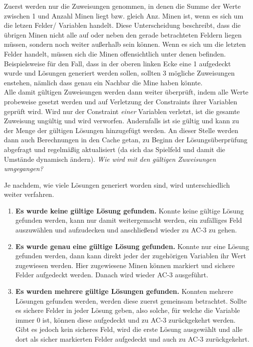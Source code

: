 Zuerst werden nur die Zuweisungen genommen, in denen die Summe der Werte zwischen 1 und Anzahl Minen liegt bzw. gleich Anz. Minen ist, wenn es
sich um die letzen Felder/ Variablen handelt. Diese Unterscheidung beschreibt, dass die übrigen Minen nicht alle auf oder neben den gerade
betrachteten Feldern liegen müssen, sondern noch weiter außerhalb sein können. Wenn es sich um die letzten Felder handelt, müssen sich die
Minen offensichtlich unter denen befinden. Beispielsweise für den Fall, dass in der oberen linken Ecke eine 1 aufgedeckt wurde und Lösungen
generiert werden sollen, sollten 3 mögliche Zuweisungen enstehen, nämlich dass genau ein Nachbar die Mine haben könnte.\\
Alle damit gültigen Zuweisungen werden dann weiter überprüft, indem alle Werte probeweise gesetzt werden und auf Verletzung der Constraints
ihrer Variablen geprüft wird. Wird nur der Constraint \textit{einer} Variablen verletzt, ist die gesamte Zuweisung ungültig und wird verworfen.
Andernfalls ist sie gültig und kann zu der Menge der gültigen Lösungen hinzugefügt werden. An dieser Stelle werden dann auch Berechnungen
in den Cache getan, zu Beginn der Lösungsüberprüfung abgefragt und regelmäßig aktualisiert (da sich das Spielfeld und damit die Umstände
dynamisch ändern).
\clearpage
\textit{Wie wird mit den gültigen Zuweisungen umgegangen?}

Je nachdem, wie viele Lösungen generiert worden sind, wird unterschiedlich weiter verfahren.
\begin{enumerate}
    \item \textbf{Es wurde keine gültige Lösung gefunden.} Konnte keine gültige Lösung gefunden werden, kann nur damit weitergemacht werden,
    ein zufälliges Feld auszuwählen und aufzudecken und anschließend wieder zu AC-3 zu gehen.
    \item \textbf{Es wurde genau eine gültige Lösung gefunden.} Konnte nur eine Lösung gefunden werden, dann kann direkt jeder der zugehörigen
    Variablen ihr Wert zugewiesen werden. Hier zugewiesene Minen können markiert und sichere Felder aufgedeckt werden. Danach wird wieder
    AC-3 ausgeführt. 
    \item \textbf{Es wurden mehrere gültige Lösungen gefunden.} Konnten mehrere Lösungen gefunden werden, werden diese zuerst gemeinsam betrachtet.
    Sollte es sichere Felder in jeder Lösung geben, also solche, für welche die Variable immer 0 ist, können diese aufgedeckt und zu AC-3
    zurückgekehrt werden. Gibt es jedoch kein sicheres Feld, wird die erste Lösung ausgewählt und alle dort als sicher markierten Felder
    aufgedeckt und auch zu AC-3 zurückgekehrt.
\end{enumerate}

